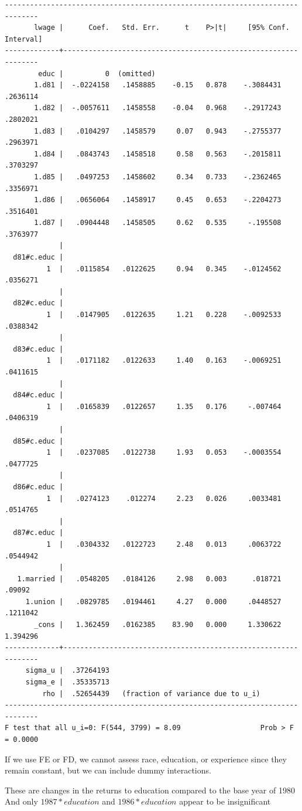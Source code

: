 \documentclass[
]{book}
\begin{document}
\begin{verbatim}
------------------------------------------------------------------------------
       lwage |      Coef.   Std. Err.      t    P>|t|     [95% Conf. Interval]
-------------+----------------------------------------------------------------
        educ |          0  (omitted)
       1.d81 |  -.0224158   .1458885    -0.15   0.878    -.3084431    .2636114
       1.d82 |  -.0057611   .1458558    -0.04   0.968    -.2917243    .2802021
       1.d83 |   .0104297   .1458579     0.07   0.943    -.2755377    .2963971
       1.d84 |   .0843743   .1458518     0.58   0.563    -.2015811    .3703297
       1.d85 |   .0497253   .1458602     0.34   0.733    -.2362465    .3356971
       1.d86 |   .0656064   .1458917     0.45   0.653    -.2204273    .3516401
       1.d87 |   .0904448   .1458505     0.62   0.535     -.195508    .3763977
             |
  d81#c.educ |
          1  |   .0115854   .0122625     0.94   0.345    -.0124562    .0356271
             |
  d82#c.educ |
          1  |   .0147905   .0122635     1.21   0.228    -.0092533    .0388342
             |
  d83#c.educ |
          1  |   .0171182   .0122633     1.40   0.163    -.0069251    .0411615
             |
  d84#c.educ |
          1  |   .0165839   .0122657     1.35   0.176     -.007464    .0406319
             |
  d85#c.educ |
          1  |   .0237085   .0122738     1.93   0.053    -.0003554    .0477725
             |
  d86#c.educ |
          1  |   .0274123    .012274     2.23   0.026     .0033481    .0514765
             |
  d87#c.educ |
          1  |   .0304332   .0122723     2.48   0.013     .0063722    .0544942
             |
   1.married |   .0548205   .0184126     2.98   0.003      .018721      .09092
     1.union |   .0829785   .0194461     4.27   0.000     .0448527    .1211042
       _cons |   1.362459   .0162385    83.90   0.000     1.330622    1.394296
-------------+----------------------------------------------------------------
     sigma_u |  .37264193
     sigma_e |  .35335713
         rho |  .52654439   (fraction of variance due to u_i)
------------------------------------------------------------------------------
F test that all u_i=0: F(544, 3799) = 8.09                   Prob > F = 0.0000
\end{verbatim}

If we use FE or FD, we cannot assess race, education, or experience since they remain constant, but we can include dummy interactions.

These are changes in the returns to education compared to the base year of 1980
And only \(1987 * education\) and \(1986 * education\) appear to be insignificant
\end{document}
